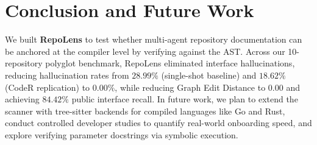\documentclass[conference]{IEEEtran}
\begin{document}
\section{Conclusion and Future Work}
We built \textbf{RepoLens} to test whether multi-agent repository documentation can be anchored at the compiler level by verifying against the AST. Across our 10-repository polyglot benchmark, RepoLens eliminated interface hallucinations, reducing hallucination rates from $28.99\%$ (single-shot baseline) and $18.62\%$ (CodeR replication) to $0.00\%$, while reducing Graph Edit Distance to $0.00$ and achieving $84.42\%$ public interface recall. In future work, we plan to extend the scanner with tree-sitter backends for compiled languages like Go and Rust, conduct controlled developer studies to quantify real-world onboarding speed, and explore verifying parameter docstrings via symbolic execution.
\end{document}
